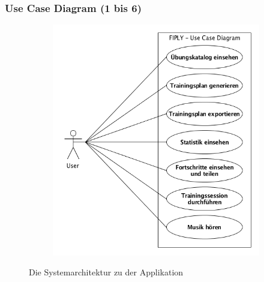 \documentclass[FIPLY_base.tex]{subfiles}
\begin{document}
	\subsubsection{Use Case Diagram (1 bis 6)}
	\begin{figure}[H]
		\begin{subfigure}[b]{0.3\textwidth}
			\centering
			\includegraphics[scale=0.75]{img/UseCaseDiagram}
		\end{subfigure}
		\caption{Die Systemarchitektur zu der Applikation}
	\end{figure}
	\newpage
\end{document}
